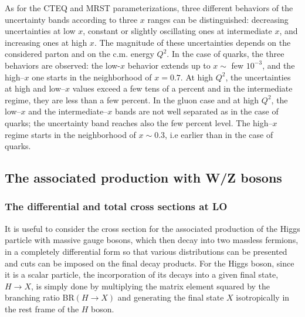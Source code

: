 As for the CTEQ and MRST parameterizations,  three different behaviors of the
uncertainty bands according to three $x$ ranges can be distinguished:
decreasing uncertainties at low $x$, constant or slightly oscillating ones at
intermediate $x$, and increasing  ones at high $x$. The magnitude of these
uncertainties depends on the considered parton  and on the c.m. energy $Q^2$.
In the case of quarks, the three behaviors are observed: the low-$x$ behavior
extends up to $x \sim$ few $10^{-3}$, and the high--$x$ one starts in the
neighborhood of $x=0.7$. At high $Q^2$, the uncertainties at high and low--$x$
values exceed a few tens of a percent and in the intermediate regime, they are
less than a few  percent. In the gluon case and at high $Q^2$, the low--$x$ and
the intermediate--$x$ bands are not well separated as in the case of quarks;
the uncertainty band reaches also the few percent level. The high--$x$  regime
starts in the neighborhood of $x \sim 0.3$, i.e earlier than in the case of
quarks.  

\newpage
\subsection{The associated production with W/Z bosons}
\subsubsection{The differential and total cross sections at LO}

It is useful to consider the cross section for the associated production of the
Higgs particle with massive gauge bosons, which then decay into two massless
fermions, in a completely differential form so that various distributions can
be presented and cuts can be imposed on the final decay products. For the Higgs
boson, since it is a scalar particle, the incorporation of its decays into a
given final  state, $H\to X$, is simply done by multiplying the matrix element
squared by the branching ratio BR$(H \to X)$ and generating the final state $X$
isotropically  in the rest frame of the $H$ boson. \s

